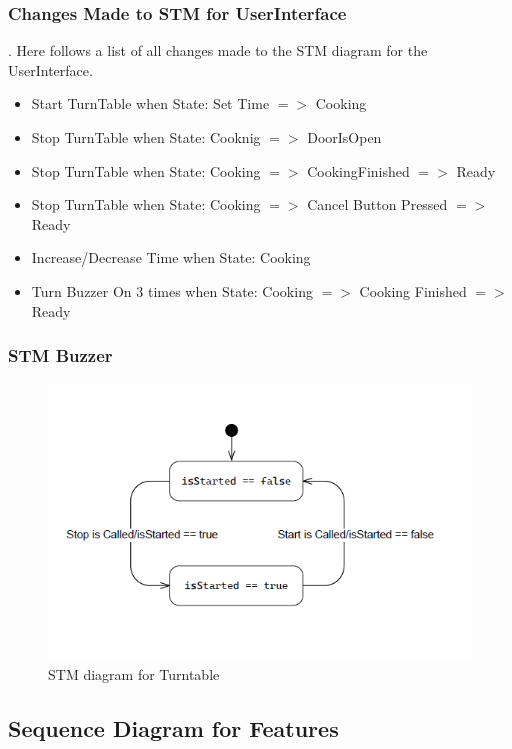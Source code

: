 \subsubsection{Changes Made to STM for UserInterface}.
Here follows a list of all changes made to the STM diagram for the UserInterface.

\begin{itemize}
  \item Start TurnTable when State: Set Time $=>$ Cooking
  \item Stop TurnTable when State: Cooknig $=>$ DoorIsOpen
  \item Stop TurnTable when State: Cooking $=>$ CookingFinished $=>$ Ready
  \item Stop TurnTable when State: Cooking $=>$ Cancel Button Pressed $=>$ Ready
  \item Increase/Decrease Time when State: Cooking
  \item Turn Buzzer On 3 times when State: Cooking $=>$ Cooking Finished $=>$ Ready 
\end{itemize}

\newpage

\subsubsection{STM Buzzer}
\begin{figure}[h]
  \centering
  \includegraphics[scale=0.6]{02-Body/Image/TurntableSTM.PNG}
  \caption{STM diagram for Turntable}%
  \label{fig:TurntableSTM}
\end{figure}

\newpage

\subsection{Sequence Diagram for Features}

